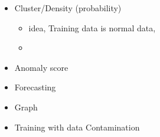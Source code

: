 \documentclass[./description.tex]{subfiles}
\begin{document}
    \begin{itemize}
        \item Cluster/Density (probability)
        \begin{itemize}
            \item idea, Training data is normal data, 
            \item 
        \end{itemize}
        \item Anomaly score
        \item Forecasting
        \item Graph
        \item Training with data Contamination
    \end{itemize}
\end{document}
